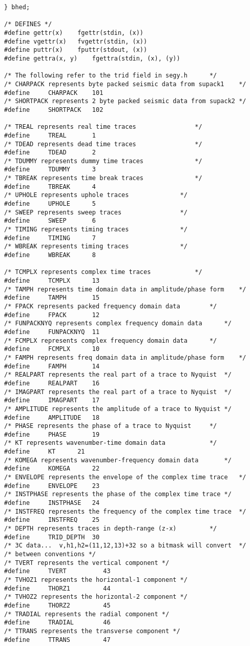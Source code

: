 {\begin{verbatim}
} bhed;

/* DEFINES */
#define gettr(x)	fgettr(stdin, (x))
#define vgettr(x)	fvgettr(stdin, (x))
#define puttr(x)	fputtr(stdout, (x))
#define gettra(x, y)    fgettra(stdin, (x), (y))

/* The following refer to the trid field in segy.h		*/
/* CHARPACK represents byte packed seismic data from supack1	*/
#define		CHARPACK	101
/* SHORTPACK represents 2 byte packed seismic data from supack2	*/
#define		SHORTPACK	102

/* TREAL represents real time traces 				*/
#define		TREAL		1
/* TDEAD represents dead time traces 				*/
#define		TDEAD		2
/* TDUMMY represents dummy time traces 				*/
#define		TDUMMY		3
/* TBREAK represents time break traces 				*/
#define		TBREAK		4
/* UPHOLE represents uphole traces 				*/
#define		UPHOLE		5
/* SWEEP represents sweep traces 				*/
#define		SWEEP		6
/* TIMING represents timing traces 				*/
#define		TIMING		7
/* WBREAK represents timing traces 				*/
#define		WBREAK		8

/* TCMPLX represents complex time traces 			*/
#define		TCMPLX		13
/* TAMPH represents time domain data in amplitude/phase form	*/
#define		TAMPH		15
/* FPACK represents packed frequency domain data 		*/
#define		FPACK		12
/* FUNPACKNYQ represents complex frequency domain data 		*/
#define		FUNPACKNYQ	11
/* FCMPLX represents complex frequency domain data 		*/
#define		FCMPLX		10
/* FAMPH represents freq domain data in amplitude/phase form	*/
#define		FAMPH		14
/* REALPART represents the real part of a trace to Nyquist	*/
#define		REALPART	16
/* IMAGPART represents the real part of a trace to Nyquist	*/
#define		IMAGPART	17
/* AMPLITUDE represents the amplitude of a trace to Nyquist	*/
#define		AMPLITUDE	18
/* PHASE represents the phase of a trace to Nyquist		*/
#define		PHASE		19
/* KT represents wavenumber-time domain data 			*/
#define		KT		21
/* KOMEGA represents wavenumber-frequency domain data		*/
#define		KOMEGA		22
/* ENVELOPE represents the envelope of the complex time trace	*/
#define		ENVELOPE	23
/* INSTPHASE represents the phase of the complex time trace	*/
#define		INSTPHASE	24
/* INSTFREQ represents the frequency of the complex time trace	*/
#define		INSTFREQ	25
/* DEPTH represents traces in depth-range (z-x)			*/
#define		TRID_DEPTH	30
/* 3C data...  v,h1,h2=(11,12,13)+32 so a bitmask will convert  */
/* between conventions */
/* TVERT represents the vertical component */
#define     TVERT          43
/* TVHOZ1 represents the horizontal-1 component */
#define     THORZ1         44
/* TVHOZ2 represents the horizontal-2 component */
#define     THORZ2         45
/* TRADIAL represents the radial component */
#define     TRADIAL        46
/* TTRANS represents the transverse component */
#define     TTRANS         47


\end{verbatim}}
